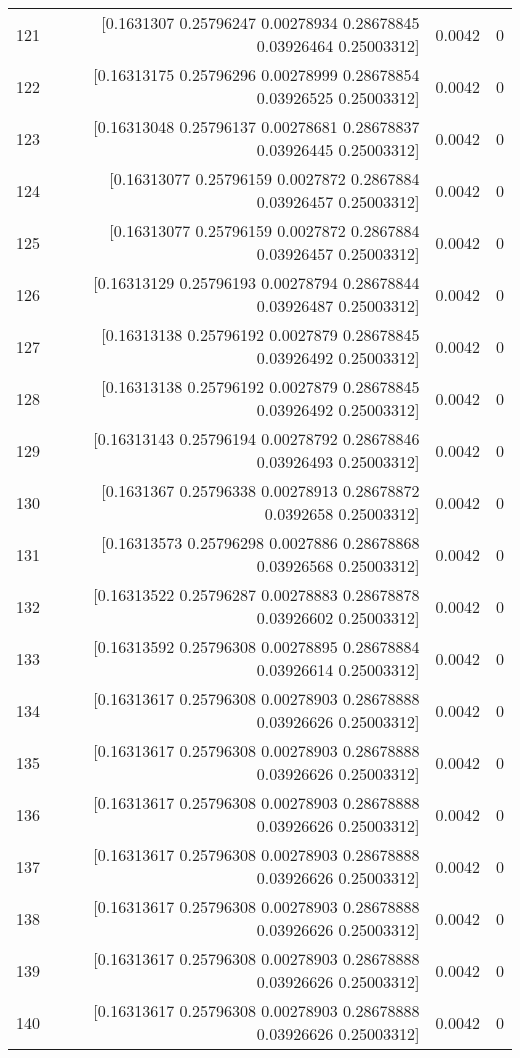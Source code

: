 \begin{longtable}{lrrr}
121 & [0.1631307  0.25796247 0.00278934 0.28678845 0.03926464 0.25003312] & 0.0042 & 0 \\
122 & [0.16313175 0.25796296 0.00278999 0.28678854 0.03926525 0.25003312] & 0.0042 & 0 \\
123 & [0.16313048 0.25796137 0.00278681 0.28678837 0.03926445 0.25003312] & 0.0042 & 0 \\
124 & [0.16313077 0.25796159 0.0027872  0.2867884  0.03926457 0.25003312] & 0.0042 & 0 \\
125 & [0.16313077 0.25796159 0.0027872  0.2867884  0.03926457 0.25003312] & 0.0042 & 0 \\
126 & [0.16313129 0.25796193 0.00278794 0.28678844 0.03926487 0.25003312] & 0.0042 & 0 \\
127 & [0.16313138 0.25796192 0.0027879  0.28678845 0.03926492 0.25003312] & 0.0042 & 0 \\
128 & [0.16313138 0.25796192 0.0027879  0.28678845 0.03926492 0.25003312] & 0.0042 & 0 \\
129 & [0.16313143 0.25796194 0.00278792 0.28678846 0.03926493 0.25003312] & 0.0042 & 0 \\
130 & [0.1631367  0.25796338 0.00278913 0.28678872 0.0392658  0.25003312] & 0.0042 & 0 \\
131 & [0.16313573 0.25796298 0.0027886  0.28678868 0.03926568 0.25003312] & 0.0042 & 0 \\
132 & [0.16313522 0.25796287 0.00278883 0.28678878 0.03926602 0.25003312] & 0.0042 & 0 \\
133 & [0.16313592 0.25796308 0.00278895 0.28678884 0.03926614 0.25003312] & 0.0042 & 0 \\
134 & [0.16313617 0.25796308 0.00278903 0.28678888 0.03926626 0.25003312] & 0.0042 & 0 \\
135 & [0.16313617 0.25796308 0.00278903 0.28678888 0.03926626 0.25003312] & 0.0042 & 0 \\
136 & [0.16313617 0.25796308 0.00278903 0.28678888 0.03926626 0.25003312] & 0.0042 & 0 \\
137 & [0.16313617 0.25796308 0.00278903 0.28678888 0.03926626 0.25003312] & 0.0042 & 0 \\
138 & [0.16313617 0.25796308 0.00278903 0.28678888 0.03926626 0.25003312] & 0.0042 & 0 \\
139 & [0.16313617 0.25796308 0.00278903 0.28678888 0.03926626 0.25003312] & 0.0042 & 0 \\
140 & [0.16313617 0.25796308 0.00278903 0.28678888 0.03926626 0.25003312] & 0.0042 & 0 \\

\end{longtable}
